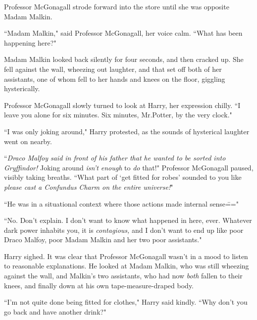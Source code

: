Professor McGonagall strode forward into the store until she was opposite Madam Malkin.

``Madam Malkin," said Professor McGonagall, her voice calm. ``What has been happening here?"

Madam Malkin looked back silently for four seconds, and then cracked up. She fell against the wall, wheezing out laughter, and that set off both of her assistants, one of whom fell to her hands and knees on the floor, giggling hysterically.

Professor McGonagall slowly turned to look at Harry, her expression chilly. ``I leave you alone for six minutes. Six minutes, Mr.\?Potter, by the very clock."

``I was only joking around," Harry protested, as the sounds of hysterical laughter went on nearby.

``\emph{Draco Malfoy said in front of his father that he wanted to be sorted into Gryffindor!} Joking around \emph{isn't enough} to \emph{do} that!" Professor McGonagall paused, visibly taking breaths. ``What part of `get fitted for robes' sounded to you like \emph{please cast a Confundus Charm on the entire universe!}"

``He was in a situational context where those actions made internal sense\==="

``No. Don't explain. I don't want to know what happened in here, ever. Whatever dark power inhabits you, it is \emph{contagious,} and I don't want to end up like poor Draco Malfoy, poor Madam Malkin and her two poor assistants."

Harry sighed. It was clear that Professor McGonagall wasn't in a mood to listen to reasonable explanations. He looked at Madam Malkin, who was still wheezing against the wall, and Malkin's two assistants, who had now \emph{both} fallen to their knees, and finally down at his own tape-measure-draped body.

``I'm not quite done being fitted for clothes," Harry said kindly. ``Why don't you go back and have another drink?"

